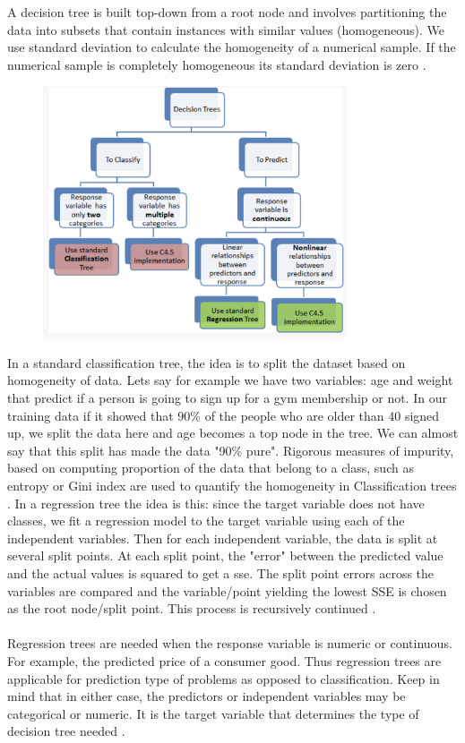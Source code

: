 A decision tree is built top-down from a root node and involves partitioning the data into subsets
that contain instances with similar values (homogeneous). We use standard deviation to calculate
the homogeneity of a numerical sample. If the numerical sample is completely homogeneous its
standard deviation is zero \cite{Saed2019}.
\begin{figure}[H]
\centering
\includegraphics[width=0.8\textwidth]{media/dt}\label{fig:dt}
\label{fig:dt}
\end{figure}
In a standard classification tree, the idea is to split the dataset based on homogeneity of data.
Lets say for example we have two variables: age and weight that predict if a person is going to
sign up for a gym membership or not. In our training data if it showed that 90\% of the people
who are older than 40 signed up, we split the data here and age becomes a top node in the
tree. We can almost say that this split has made the data "90\% pure". Rigorous measures of
impurity, based on computing proportion of the data that belong to a class, such as entropy or
Gini index are used to quantify the homogeneity in Classification trees \cite{BalaDeshpande2011}.
In a regression tree the idea is this: since the target variable does not have classes, we fit a
regression model to the target variable using each of the independent variables. Then for each
independent variable, the data is split at several split points. At each split point, the "error"
between the predicted value and the actual values is squared to get a \acf{sse}. The split point errors across the variables are compared and the variable/point yielding
the lowest SSE is chosen as the root node/split point. This process is recursively continued \cite{BalaDeshpande2011}.\\\\
Regression trees are needed when the response variable is numeric or continuous. For
example, the predicted price of a consumer good. Thus regression trees are applicable for
prediction type of problems as opposed to classification.
Keep in mind that in either case, the predictors or independent variables may be categorical or
numeric. It is the target variable that determines the type of decision tree needed \cite{BalaDeshpande2011}.\\\\

